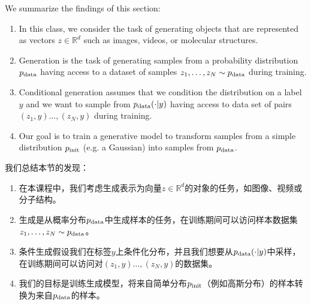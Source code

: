 \begin{summarybox} We summarize the findings of this section:
\begin{enumerate}
\item In this class, we consider the task of generating objects that are represented as vectors $z\in\mathbb{R}^d$ such as images, videos, or molecular structures.
\item Generation is the task of generating samples from a probability distribution $p_{\rm{data}}$ having access to a dataset of samples $z_1,\dots,z_N\sim p_{\rm{data}}$ during training. 
\item Conditional generation assumes that we condition the distribution on a label $y$ and we want to sample from $p_{\rm{data}}(\cdot|y)$ having access to data set of pairs $(z_1,y)\dots,(z_N,y)$ during training.
\item Our goal is to train a generative model to transform samples from a simple distribution $p_{\rm{init}}$ (e.g. a Gaussian) into samples from $p_{\rm{data}}$.
\end{enumerate}

我们总结本节的发现：
\begin{enumerate}
\item 在本课程中，我们考虑生成表示为向量$z\in\mathbb{R}^d$的对象的任务，如图像、视频或分子结构。
\item 生成是从概率分布$p_{\rm{data}}$中生成样本的任务，在训练期间可以访问样本数据集$z_1,\dots,z_N\sim p_{\rm{data}}$。
\item 条件生成假设我们在标签$y$上条件化分布，并且我们想要从$p_{\rm{data}}(\cdot|y)$中采样，在训练期间可以访问对$(z_1,y)\dots,(z_N,y)$的数据集。
\item 我们的目标是训练生成模型，将来自简单分布$p_{\rm{init}}$（例如高斯分布）的样本转换为来自$p_{\rm{data}}$的样本。
\end{enumerate}
\end{summarybox}
